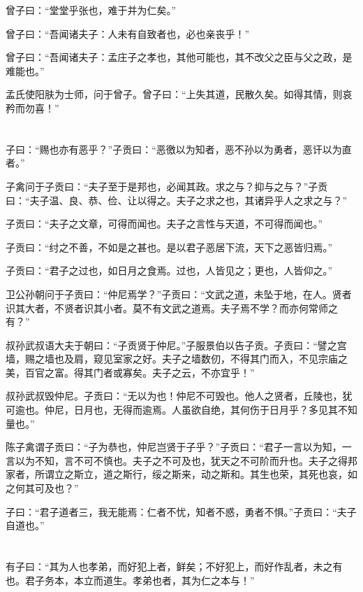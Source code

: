 \documentclass[a5paper]{ctexbook}
\begin{document}
    曾子曰：“堂堂乎张也，难于并为仁矣。” 
    
    曾子曰：“吾闻诸夫子：人未有自致者也，必也亲丧乎！” 
    
    曾子曰：“吾闻诸夫子：孟庄子之孝也，其他可能也，其不改父之臣与父之政，是难能也。”

    孟氏使阳肤为士师，问于曾子。曾子曰：“上失其道，民散久矣。如得其情，则哀矜而勿喜！”

    \chapter{}

    子曰：“赐也亦有恶乎？”子贡曰：“恶徼以为知者，恶不孙以为勇者，恶讦以为直者。”

    子禽问于子贡曰：“夫子至于是邦也，必闻其政。求之与？抑与之与？”子贡曰：“夫子温、良、恭、俭、让以得之。夫子之求之也，其诸异乎人之求之与？”

    子贡曰：“夫子之文章，可得而闻也。夫子之言性与天道，不可得而闻也。”

    子贡曰：“纣之不善，不如是之甚也。是以君子恶居下流，天下之恶皆归焉。” 
    
    子贡曰：“君子之过也，如日月之食焉。过也，人皆见之；更也，人皆仰之。” 
    
    卫公孙朝问于子贡曰：“仲尼焉学？”子贡曰：“文武之道，未坠于地，在人。贤者识其大者，不贤者识其小者。莫不有文武之道焉。夫子焉不学？而亦何常师之有？”

    叔孙武叔语大夫于朝曰：“子贡贤于仲尼。”子服景伯以告子贡。子贡曰：“譬之宫墙，赐之墙也及肩，窥见室家之好。夫子之墙数仞，不得其门而入，不见宗庙之美，百官之富。得其门者或寡矣。夫子之云，不亦宜乎！”

    叔孙武叔毁仲尼。子贡曰：“无以为也！仲尼不可毁也。他人之贤者，丘陵也，犹可逾也。仲尼，日月也，无得而逾焉。人虽欲自绝，其何伤于日月乎？多见其不知量也。”

    陈子禽谓子贡曰：“子为恭也，仲尼岂贤于子乎？”子贡曰：“君子一言以为知，一言以为不知，言不可不慎也。夫子之不可及也，犹天之不可阶而升也。夫子之得邦家者，所谓立之斯立，道之斯行，绥之斯来，动之斯和。其生也荣，其死也哀，如之何其可及也？”

    子曰：“君子道者三，我无能焉：仁者不忧，知者不惑，勇者不惧。”子贡曰：“夫子自道也。”

    \chapter{}

    有子曰：“其为人也孝弟，而好犯上者，鲜矣；不好犯上，而好作乱者，未之有也。君子务本，本立而道生。孝弟也者，其为仁之本与！”
\end{document}
